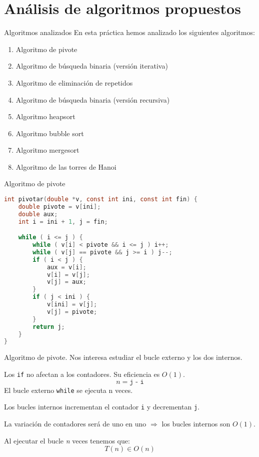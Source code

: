 \documentclass[10pt, xcolor=table]{beamer}
\begin{document}
\section{Análisis de algoritmos propuestos}
\begin{frame}{Algoritmos analizados}
En esta práctica hemos analizado los siguientes algoritmos:
\begin{enumerate}
	\item Algoritmo de pivote
	\item Algoritmo de búsqueda binaria (versión iterativa)
	\item Algoritmo de eliminación de repetidos
	\item Algoritmo de búsqueda binaria (versión recursiva)
	\item Algoritmo heapsort
	\item Algoritmo bubble sort
	\item Algoritmo mergesort
	\item Algoritmo de las torres de Hanoi	
\end{enumerate}
\end{frame}
\begin{frame}[fragile]{Algoritmo de pivote}
\begin{lstlisting}[language=C]
int pivotar(double *v, const int ini, const int fin) {
	double pivote = v[ini];
	double aux;
	int i = ini + 1, j = fin;

	while ( i <= j ) {
		while ( v[i] < pivote && i <= j ) i++;
		while ( v[j] == pivote && j >= i ) j--;
		if ( i < j ) {
			aux = v[i];
			v[i] = v[j];
			v[j] = aux;
		}
		if ( j < ini ) {
			v[ini] = v[j];
			v[j] = pivote;
		}
		return j;
	}
}
\end{lstlisting}
\end{frame}
\begin{frame}[fragile]{Algoritmo de pivote. }
Nos interesa estudiar el bucle externo y los dos internos.

Los \texttt{if} no afectan a los contadores. Su eficiencia es $O(1)$.
$$n = \texttt{j - i}$$
El bucle externo \texttt{while} se ejecuta n veces.

Los bucles internos incrementan el contador \texttt{i} y decrementan \texttt{j}.

La variación de contadores será de uno en uno $\Rightarrow$ los bucles internos son $O(1)$.

Al ejecutar el bucle \textit{n} veces tenemos que:$$T(n) \in O(n)$$


\end{frame}
\end{document}
